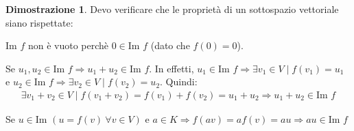 \documentclass[a4paper]{article}
\theoremstyle{definition}
\newtheorem*{dimm}{Dimostrazione}
\begin{document}
\begin{dimm}
	Devo verificare che le proprietà di un sottospazio vettoriale siano rispettate:
	\begin{description}
		\item Im $f$ non è vuoto perchè $0 \in \text{Im } f$ (dato che $f(0) = 0$).
		\item Se $u_1, u_2 \in \text{Im } f \Rightarrow u_1 + u_2 \in \text{Im } f$. In effetti, $u_1 \in \text{Im } f \Rightarrow \exists v_1 \in V \mid f(v_1) = u_1$ e $u_2 \in \text{Im } f \Rightarrow \exists v_2 \in V \mid f(v_2) = u_2$. Quindi:
		      \begin{align*}
			      \exists v_1 + v_2 \in V \mid f(v_1 + v_2) = f(v_1) + f(v_2) = u_1 + u_2 \Rightarrow u_1 + u_2 \in \text{Im } f
		      \end{align*}
		\item Se $u \in \text{Im } (u = f(v) \ \forall v \in V)$ e $a \in K \Rightarrow f(av) = af(v) = au \Rightarrow au \in \text{Im } f$
	\end{description}
\end{dimm}
\end{document}
